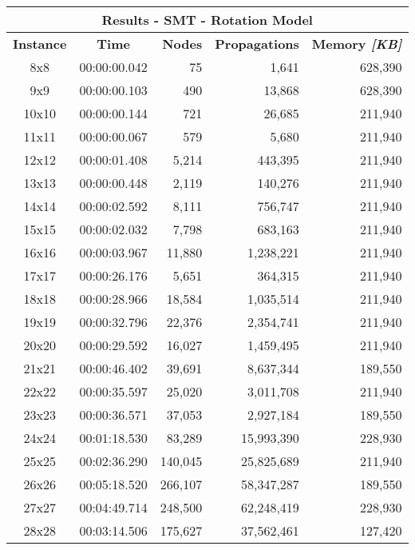 
\begin{center}
    \begin{tabular}{|c|c|r|r|r|}
        \hline
        \multicolumn{5}{|c|}{\textbf{Results - SMT - Rotation Model}} \\
        \hline
        \textbf{Instance} & \textbf{Time} & \textbf{Nodes} & \textbf{Propagations} & \textbf{Memory \textit{[KB]}} \\
        
        \hline
		8x8 & 00:00:00.042 & 75 & 1,641 & 628,390 \\ \hline
		9x9 & 00:00:00.103 & 490 & 13,868 & 628,390 \\ \hline
		10x10 & 00:00:00.144 & 721 & 26,685 & 211,940 \\ \hline
		11x11 & 00:00:00.067 & 579 & 5,680 & 211,940 \\ \hline
		12x12 & 00:00:01.408 & 5,214 & 443,395 & 211,940 \\ \hline
		13x13 & 00:00:00.448 & 2,119 & 140,276 & 211,940 \\ \hline
		14x14 & 00:00:02.592 & 8,111 & 756,747 & 211,940 \\ \hline
		15x15 & 00:00:02.032 & 7,798 & 683,163 & 211,940 \\ \hline
		16x16 & 00:00:03.967 & 11,880 & 1,238,221 & 211,940 \\ \hline
		17x17 & 00:00:26.176 & 5,651 & 364,315 & 211,940 \\ \hline
		18x18 & 00:00:28.966 & 18,584 & 1,035,514 & 211,940 \\ \hline
		19x19 & 00:00:32.796 & 22,376 & 2,354,741 & 211,940 \\ \hline
		20x20 & 00:00:29.592 & 16,027 & 1,459,495 & 211,940 \\ \hline
		21x21 & 00:00:46.402 & 39,691 & 8,637,344 & 189,550 \\ \hline
		22x22 & 00:00:35.597 & 25,020 & 3,011,708 & 211,940 \\ \hline
		23x23 & 00:00:36.571 & 37,053 & 2,927,184 & 189,550 \\ \hline
		24x24 & 00:01:18.530 & 83,289 & 15,993,390 & 228,930 \\ \hline
		25x25 & 00:02:36.290 & 140,045 & 25,825,689 & 211,940 \\ \hline
		26x26 & 00:05:18.520 & 266,107 & 58,347,287 & 189,550 \\ \hline
		27x27 & 00:04:49.714 & 248,500 & 62,248,419 & 228,930 \\ \hline
		28x28 & 00:03:14.506 & 175,627 & 37,562,461 & 127,420 \\ \hline

\end{tabular}
\end{center}
